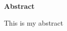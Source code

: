\thispagestyle{plain}
\begin{center}
    \Large
    \textbf{Abstract}

    \vspace{0.5cm}
    \normalsize
    This is my abstract
\end{center}
